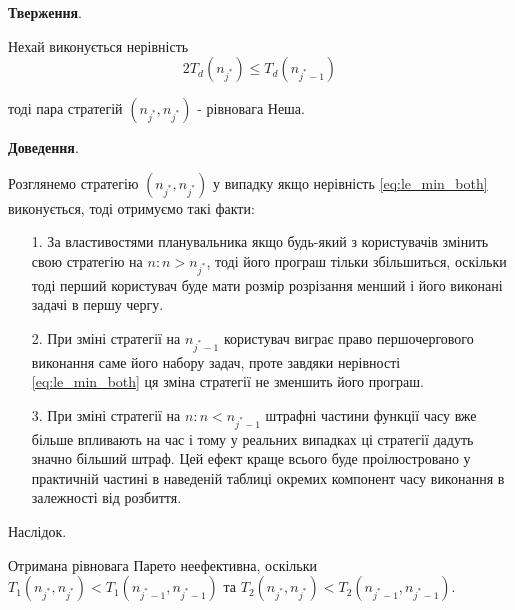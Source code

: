 \textbf{Тверження}.

Нехай виконується нерівність
\begin{equation}
	2T_d(n_{j^*}) \le T_d(n_{{j^*}-1})
	\label{eq:le_min_both}
\end{equation}

тоді пара стратегій $(n_{j^*},n_{j^*})$ - рівновага Неша.

\textbf{Доведення}.

Розглянемо стратегію $(n_{j^*},n_{j^*})$ у випадку якщо нерівність \ref{eq:le_min_both} виконується, тоді отримуємо такі факти:
\begin{itemize}
	\item[1.] За властивостями планувальника якщо будь-який з користувачів змінить свою стратегію на $n: n > n_{j^*}$, тоді його програш тільки збільшиться, оскільки тоді перший користувач буде мати розмір розрізання менший і його виконані задачі в першу чергу.
	
	\item[2.] При зміні стратегії на $n_{j^*-1}$ користувач виграє право першочергового виконання саме його набору задач, проте завдяки нерівності \ref{eq:le_min_both} ця зміна стратегії не зменшить його програш.
	
	\item[3.] При зміні стратегії на $n: n < n_{j^* - 1}$ штрафні частини функції часу вже більше впливають на час і тому у реальних випадках ці стратегії дадуть значно більший штраф. Цей ефект краще всього буде проілюстровано у практичній частині в наведеній таблиці окремих компонент часу виконання в залежності від розбиття.
\end{itemize}

Наслідок.

Отримана рівновага Парето неефективна, оскільки $T_1(n_{j^*},n_{j^*}) < T_1(n_{j^*-1},n_{j^*-1})$ та $T_2(n_{j^*},n_{j^*}) < T_2(n_{j^*-1},n_{j^*-1})$.




 